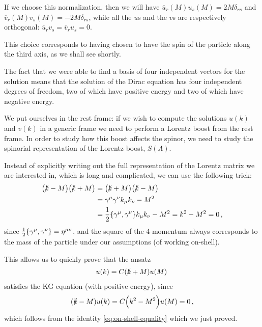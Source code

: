 \documentclass[main.tex]{subfiles}
\begin{document}
If we choose this normalization, then we will have \(\overline{u}_{r}(M) u_s(M) = 2 M \delta_{rs}\) and \(\overline{v}_{r}(M) v_s(M) =- 2 M \delta_{rs}\), while all the \(u\)s and the \(v\)s are respectively orthogonal: \(\overline{u}_{r} v_s =  \overline{v}_{r} u_s = 0\). 

This choice corresponds to having chosen to have the spin of the particle along the third axis, as we shall see shortly. 

The fact that we were able to find a basis of four independent vectors for the solution means that the solution of the Dirac equation has four independent degrees of freedom, two of which have positive energy and two of which have negative energy. 

We put ourselves in the rest frame: if we wish to compute the solutions \(u(k)\) and \(v(k)\) in a generic frame we need to perform a Lorentz boost from the rest frame. 
In order to study how this boost affects the spinor, we need to study the spinorial representation of the Lorentz boost, \(S(\Lambda)\). 

Instead of explicitly writing out the full representation of the Lorentz matrix we are interested in, which is long and complicated, we can use the following trick: 
%
\begin{align} \label{eq:on-shell-equality}
\qty(\slashed{k} - M) \qty(\slashed{k} + M)
&=
\qty(\slashed{k} + M) \qty(\slashed{k} - M) \\
&= \gamma^{\mu } \gamma^{\nu } k_{\mu }k_{\nu } - M^2   \\
&= \frac{1}{2} \qty{\gamma^{\mu }, \gamma^{\nu }} k_{\mu } k_{\nu } - M^2 = k^2-M^2 = 0
\,,
\end{align}
%
since \( \frac{1}{2} \qty{\gamma^{\mu }, \gamma^{\nu }} = \eta^{\mu \nu }\), and the square of the 4-momentum always corresponds to the mass of the particle under our assumptions (of working on-shell).

This allows us to quickly prove that the ansatz 
%
\begin{align}
u(k) = C (\slashed{k} + M) u(M)
\,
\end{align}
%
satisfies the KG equation (with positive energy), since 
%
\begin{align}
(\slashed{k} - M) u(k) = C \qty(k^2 - M^2) u(M) = 0
\,,
\end{align}
%
which follows from the identity \eqref{eq:on-shell-equality} which we just proved.

\end{document}
